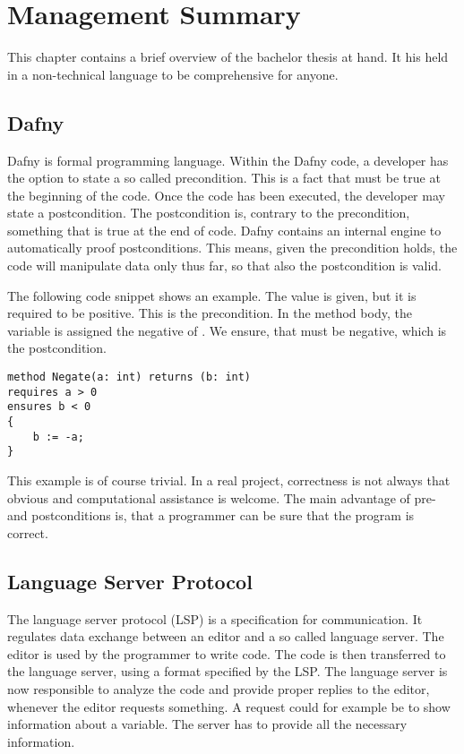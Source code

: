 \section{Management Summary}
\label{section:management_summary}
This chapter contains a brief overview of the bachelor thesis at hand.
It his held in a non-technical language to be comprehensive for anyone.

\subsection{Dafny}
\label{section:introduction:dafny}
Dafny is formal programming language.
Within the Dafny code, a developer has the option to state a so called precondition.
This is a fact that must be true at the beginning of the code.
Once the code has been executed, the developer may state a postcondition.
The postcondition is, contrary to the precondition, something that is true at the end of code.
Dafny contains an internal engine to automatically proof postconditions.
This means, given the precondition holds, the code will manipulate data only thus far, so that also the postcondition is valid.

The following code snippet shows an example.
The value  is given, but it is required to be positive.
This is the precondition.
In the method body, the variable  is assigned the negative of .
We ensure, that  must be negative, which is the postcondition.

\begin{lstlisting}[language=dafny, caption={Simple Dafny Example}, captionpos=b, label={lst:simpleDafnyExample}]
method Negate(a: int) returns (b: int)
requires a > 0
ensures b < 0
{
    b := -a;
}
\end{lstlisting}

This example is of course trivial.
In a real project, correctness is not always that obvious and computational assistance is welcome.
The main advantage of pre- and postconditions is, that a programmer can be sure that the program is correct.


\subsection{Language Server Protocol}
The language server protocol (LSP) is a specification for communication.
It regulates data exchange between an editor and a so called language server.
The editor is used by the programmer to write code.
The code is then transferred to the language server, using a format specified by the LSP.
The language server is now responsible to analyze the code and provide proper replies to the editor, whenever the editor requests something.
A request could for example be to show information about a variable.
The server has to provide all the necessary information.\\

